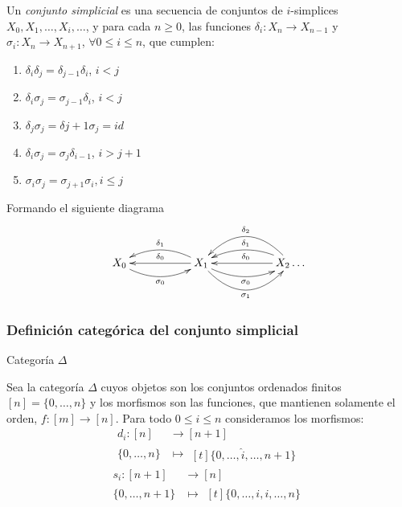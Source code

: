 \documentclass[../main.tex]{subfiles}
\begin{document}
\begin{defi}
    Un \emph{conjunto simplicial} es una secuencia de conjuntos de $i$-simplices $X_0,X_1,\dots,X_i,\dots$, y para cada $n\ge 0$, las funciones $\delta_i: X_n \longrightarrow X_{n-1}$ y $\sigma_i: X_n \longrightarrow X_{n+1}$, $\forall 0\le i \le n$, que cumplen:

    \begin{enumerate}[(1)]
        \item $\delta_i\delta_j = \delta_{j-1}\delta_{i}$, $i<j$
        \item $\delta_i\sigma_j = \sigma_{j-1}\delta_{i}$, $i<j$
        \item $\delta_j\sigma_j = \delta{j+1}\sigma_{j} = id$
        \item $\delta_i\sigma_j = \sigma_{j}\delta_{i-1}$, $i>j+1$
        \item $\sigma_i\sigma_j = \sigma_{j+1}\sigma_{i}, i\le j$
    \end{enumerate}
    Formando el siguiente diagrama
    $$
        \xymatrix{
        X_0 \ar@/{}_{1pc}/[rr]_{\sigma_0} & & X_1 \ar@/{}_{1pc}/[rr]_{\sigma_0} \ar@/{}_{2pc}/[rr]_{\sigma_1} \ar@/{}_{1pc}/[ll]_{\delta_1} \ar[ll]_{\delta_0} & & X_2 \ar@/{}_{2pc}/[ll]_{\delta_2} \ar@/{}_{1pc}/[ll]_{\delta_1} \ar[ll]_{\delta_0} \dots
        }
    $$
\end{defi}

\subsubsection{Definici\'on categ\'orica del conjunto simplicial}
\begin{defi}
    Categor\'ia $\Delta$
\end{defi}
Sea la categor\'ia $\Delta$ cuyos objetos son los conjuntos ordenados finitos $[n] = \{0,\dots,n\}$ y los morfismos son las funciones, que mantienen solamente el orden, $f: [m] \longrightarrow [n]$.
Para todo $0\le i \le n$ consideramos los morfismos:
\begin{align*}
    d_i: [n]      & \longrightarrow [n+1] \\
    \{0,\dots,n\} & \longmapsto\!
    \begin{aligned}[t]
        \{0,\dots, \hat{i}, \dots,n+1\}
    \end{aligned}
\end{align*}
\begin{align*}
    s_i: [n+1]      & \longrightarrow [n] \\
    \{0,\dots,n+1\} & \longmapsto\!
    \begin{aligned}[t]
        \{0,\dots,i,i, \dots,n\}
    \end{aligned}
\end{align*}
\end{document}
